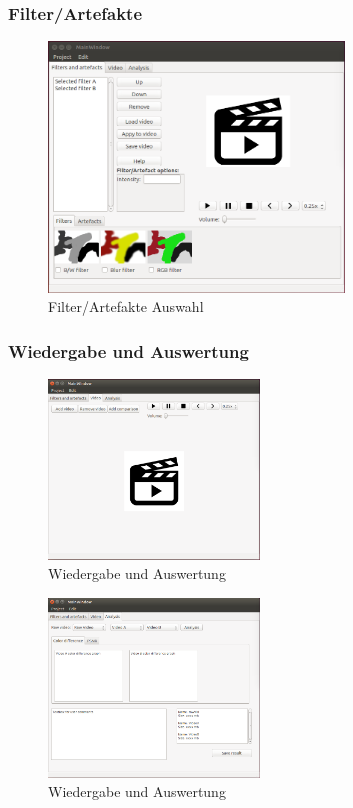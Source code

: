 \documentclass[parskip=full]{scrartcl}
\begin{document}
\subsubsection{Filter/Artefakte}
\begin{figure}[htbp] 
\centering
\includegraphics[width=0.7\textwidth]{ToViET/Screenshots/MainWindow_1.png}
\caption{Filter/Artefakte Auswahl}
\end{figure}
\newpage
\subsubsection{Wiedergabe und Auswertung}
\begin{figure}[htbp]
\centering
\includegraphics[width=0.5\textwidth]{ToViET/Screenshots/MainWindow_3.png}
\caption{Wiedergabe und Auswertung}
\end{figure}
\begin{figure}[htbp]
\centering
\includegraphics[width=0.5\textwidth]{ToViET/Screenshots/MainWindow_4.png}
\caption{Wiedergabe und Auswertung}
\end{figure}
\newpage
\end{document}
